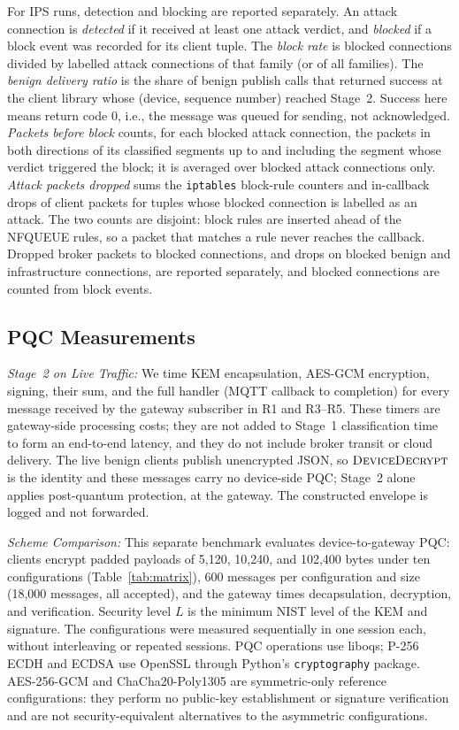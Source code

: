 \documentclass[journal]{IEEEtran}
\begin{document}
For IPS runs, detection and blocking are reported separately. An attack connection is \emph{detected} if it received at least one attack verdict, and \emph{blocked} if a block event was recorded for its client tuple. The \emph{block rate} is blocked connections divided by labelled attack connections of that family (or of all families). The \emph{benign delivery ratio} is the share of benign publish calls that returned success at the client library whose (device, sequence number) reached Stage~2. Success here means return code 0, i.e., the message was queued for sending, not acknowledged. \emph{Packets before block} counts, for each blocked attack connection, the packets in both directions of its classified segments up to and including the segment whose verdict triggered the block; it is averaged over blocked attack connections only. \emph{Attack packets dropped} sums the \texttt{iptables} block-rule counters and in-callback drops of client packets for tuples whose blocked connection is labelled as an attack. The two counts are disjoint: block rules are inserted ahead of the NFQUEUE rules, so a packet that matches a rule never reaches the callback. Dropped broker packets to blocked connections, and drops on blocked benign and infrastructure connections, are reported separately, and blocked connections are counted from block events.

\subsection{PQC Measurements}

\textit{Stage~2 on Live Traffic:} We time KEM encapsulation, AES-GCM encryption, signing, their sum, and the full handler (MQTT callback to completion) for every message received by the gateway subscriber in R1 and R3--R5. These timers are gateway-side processing costs; they are not added to Stage~1 classification time to form an end-to-end latency, and they do not include broker transit or cloud delivery. The live benign clients publish unencrypted JSON, so $\textsc{DeviceDecrypt}$ is the identity and these messages carry no device-side PQC; Stage~2 alone applies post-quantum protection, at the gateway. The constructed envelope is logged and not forwarded.

\textit{Scheme Comparison:} This separate benchmark evaluates device-to-gateway PQC: clients encrypt padded payloads of 5,120, 10,240, and 102,400 bytes under ten configurations (Table~\ref{tab:matrix}), 600 messages per configuration and size (18,000 messages, all accepted), and the gateway times decapsulation, decryption, and verification. Security level $L$ is the minimum NIST level of the KEM and signature. The configurations were measured sequentially in one session each, without interleaving or repeated sessions. PQC operations use liboqs; P-256 ECDH and ECDSA use OpenSSL through Python's \texttt{cryptography} package. AES-256-GCM and ChaCha20-Poly1305 are symmetric-only reference configurations: they perform no public-key establishment or signature verification and are not security-equivalent alternatives to the asymmetric configurations.
\end{document}
